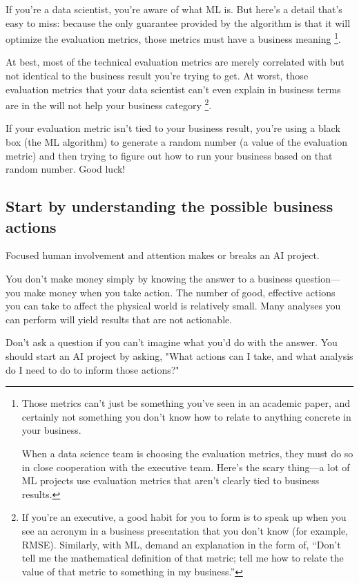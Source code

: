 If you're a data scientist, you're aware of what ML is. But
here's a detail that's easy to miss: because the only guarantee
provided by the algorithm is that it will optimize the
evaluation metrics, those metrics must have a business meaning
\footnote{
    Those metrics can't just be something you've seen in an
    academic paper, and certainly not something you don't know
    how to relate to anything concrete in your business.

    When a data science team is choosing the evaluation metrics,
    they must do so in close cooperation with the executive
    team. Here's the scary thing—a lot of ML projects
    use evaluation metrics that aren't clearly tied to business
    results.
}.

At best, most of the technical evaluation metrics are merely
correlated with but not identical to the business result you're
trying to get. At worst, those evaluation metrics that your data
scientist can't even explain in business terms are in the will
not help your business category
\footnote{
    If you're an executive, a good habit for you to form is to
    speak up when you see an acronym in a business presentation
    that you don't know (for example, RMSE). Similarly, with ML,
    demand an explanation in the form of, “Don't tell me the
    mathematical definition of that metric; tell me how to
    relate the value of that metric to something in my business.”
}.

If your evaluation metric isn't tied to your business result,
you're using a black box (the ML algorithm) to generate a random
number (a value of the evaluation metric) and then trying to
figure out how to run your business based on that random number.
Good luck!


\subsection{Start by understanding the possible business actions}
Focused human involvement and attention makes or breaks an AI
project.

You don't make money simply by knowing the answer to a business
question—you make money when you take action. The number of good,
effective actions you can take to affect the physical world is
relatively small. Many analyses you can perform will yield
results that are not actionable.

Don't ask a question if you can't imagine what you'd do with the
answer. You should start an AI project by asking, "What actions
can I take, and what analysis do I need to do to inform those
actions?"

